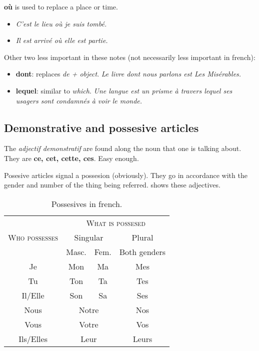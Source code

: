 \documentclass{epflnotes}
\begin{document}
\textbf{où} is used to replace a place or time.

\begin{itemize}
\item \textit{C'est le lieu où je suis tombé.}
\item \textit{Il est arrivé où elle est partie.}
\end{itemize}

Other two less important in these notes (not necessarily less important in french):

\begin{itemize}
\item \textbf{dont}: replaces \textit{de + object}. \textit{Le livre dont nous parlons est Les Misérables.}
\item \textbf{lequel}: similar to \textit{which}. \textit{Une langue est un prisme à travers lequel ses usagers sont condamnés à voir le monde.}
\end{itemize}

\subsection{Demonstrative and possesive articles}

The \textit{adjectif demonstratif} are found along the noun that one is talking about. They are \textbf{ce, cet, cette, ces}. Easy enough.

Posesive articles signal a possesion (obviously). They go in accordance with the gender and number of the thing being referred.  shows these adjectives.

\begin{table}[hbtp]
\centering
\begin{tabular}{c|cc|c}
 & \multicolumn{3}{c}{\textsc{What is possesed}} \\
\textsc{Who possesses}	& \multicolumn{2}{c}{Singular} & Plural \\
	& Masc. & Fem. & Both genders \\ \midrule
Je & Mon & Ma & Mes \\
Tu & Ton & Ta & Tes \\
Il/Elle & Son & Sa & Ses \\
Nous & \multicolumn{2}{c|}{Notre} & Nos \\
Vous & \multicolumn{2}{c|}{Votre} & Vos \\
Ils/Elles & \multicolumn{2}{c|}{Leur} & Leurs \\
\end{tabular}
\caption{Possesives in french.}
\label{tab:Possesives}
\end{table}
\end{document}
